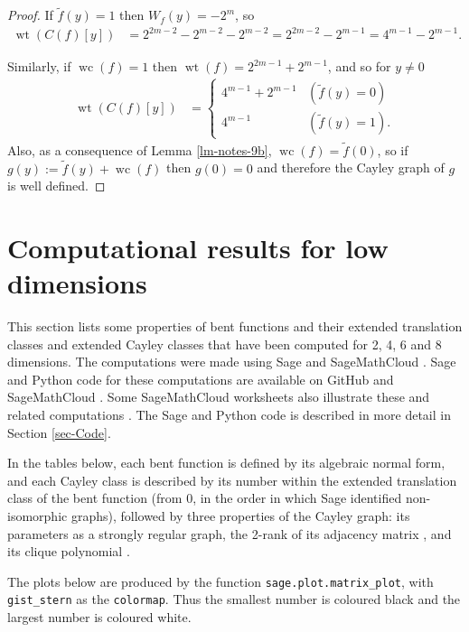\documentclass[12pt,a4paper]{article}
\newcommand{\dual}[1]{\widetilde{#1}}
\newcommand{\weight}[1]{\operatorname{wt}\left(#1\right)}
\newcommand{\weightclass}[1]{\operatorname{wc}\left(#1\right)}
\begin{document}
\begin{proof}
If $\dual{f}(y) = 1$ then $W_f(y) = -2^m$, so
\begin{align*}
\weight{C(f)[y]}
&=
2^{2m-2}-2^{m-2} - 2^{m-2}
=
2^{2m-2} - 2^{m-1}
=
4^{m-1} - 2^{m-1}.
\end{align*}

Similarly, if $\weightclass{f} = 1$ then $\weight{f} = 2^{2m-1}+2^{m-1}$,
and so for $y \neq 0$
\begin{align*}
\weight{C(f)[y]}
&=
\begin{cases}
4^{m-1} + 2^{m-1} & (\dual{f}(y)=0)
\\
4^{m-1}           & (\dual{f}(y)=1).
\end{cases}
\end{align*}
Also, as a consequence of Lemma \ref{lm-notes-9b}, $\weightclass{f} = \dual{f}(0)$,
so if $g(y) := \dual{f}(y) + \weightclass{f}$ then $g(0)=0$ and therefore the Cayley graph of $g$
is well defined.
\end{proof}


\section{Computational results for low dimensions}
\label{sec-Empirical}
This section lists some properties of bent functions and their extended translation classes and extended Cayley classes
that have been computed for 2, 4, 6 and 8 dimensions.
The computations were made using Sage \cite{SageMath7517} and Sage\-Math\-Cloud \cite{SageMathCloud}.
Sage and Python code for these computations are available on GitHub \cite{Leo16GitHub} and Sage\-Math\-Cloud \cite{Leo16SMC}.
Some Sage\-Math\-Cloud worksheets also illustrate these and related computations \cite{Leo16SMC}.
The Sage and Python code is described in more detail in Section \ref{sec-Code}.

In the tables below, each bent function is defined by its algebraic normal form, and each Cayley class is described by
its number within the extended translation class of the bent function (from 0, in the order in which Sage identified non-isomorphic graphs),
followed by three properties of the Cayley graph: its parameters as a strongly regular graph, the 2-rank of its adjacency matrix \cite{Brov92},
and its clique polynomial \cite{HoeL94}.

The plots below are produced by the function \texttt{sage.}\texttt{plot.}\texttt{matrix\_plot},
with \texttt{gist\_stern} as the \texttt{colormap}.
Thus the smallest number is coloured black and the largest number is coloured white.
\end{document}
